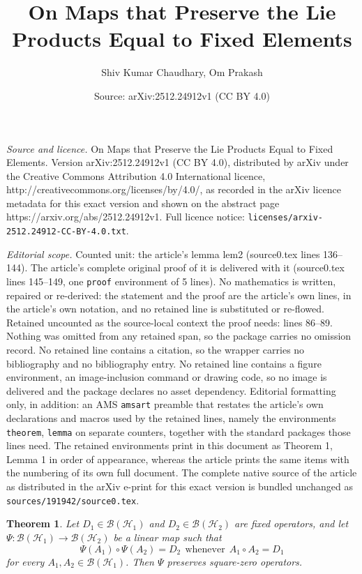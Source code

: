 \documentclass[10pt,a4paper]{amsart}
\title{On Maps that Preserve the Lie Products Equal to Fixed Elements}
\author{Shiv Kumar Chaudhary, Om Prakash}
\date{Source: arXiv:2512.24912v1 (CC BY 4.0)}
\newtheorem{theorem}{Theorem}
\begin{document}
\maketitle

\noindent\emph{Source and licence.} On Maps that Preserve the Lie Products Equal to Fixed Elements. Version arXiv:2512.24912v1 (CC BY 4.0), distributed by arXiv under the Creative Commons Attribution 4.0 International licence, http://creativecommons.org/licenses/by/4.0/, as recorded in the arXiv licence metadata for this exact version and shown on the abstract page https://arxiv.org/abs/2512.24912v1. Full licence notice: \texttt{licenses/arxiv-2512.24912-CC-BY-4.0.txt}.\par\smallskip

\noindent\textit{Editorial scope.} Counted unit: the article's lemma lem2 (source0.tex lines 136--144). The article's complete original proof of it is delivered with it (source0.tex lines 145--149, one \texttt{proof} environment of 5 lines). No mathematics is written, repaired or re-derived: the statement and the proof are the article's own lines, in the article's own notation, and no retained line is substituted or re-flowed.  Retained uncounted as the source-local context the proof needs: lines 86--89.  Nothing was omitted from any retained span, so the package carries no omission record.  No retained line contains a citation, so the wrapper carries no bibliography and no bibliography entry.  No retained line contains a figure environment, an image-inclusion command or drawing code, so no image is delivered and the package declares no asset dependency.  Editorial formatting only, in addition: an AMS \texttt{amsart} preamble that restates the article's own declarations and macros used by the retained lines, namely the environments \texttt{theorem}, \texttt{lemma} on separate counters, together with the standard packages those lines need.  The retained environments print in this document as Theorem 1, Lemma 1 in order of appearance, whereas the article prints the same items with the numbering of its own full document.  The complete native source of the article as distributed in the arXiv e-print for this exact version is bundled unchanged as \texttt{sources/191942/source0.tex}.
\begin{theorem}
    \label{th3}
	Let $D_1 \in \mathscr{B}(\mathscr{H}_1)$ and $D_2 \in \mathscr{B}(\mathscr{H}_2)$ are fixed operators, and let $\Psi : \mathscr{B}(\mathscr{H}_1) \to \mathscr{B}(\mathscr{H}_2)$ be a linear map such that $$\Psi(A_1) \circ \Psi(A_2)=D_2 ~~\text{whenever}~~ A_1 \circ A_2=D_1$$ for every $A_1,A_2 \in \mathscr{B}(\mathscr{H}_1)$. Then $\Psi$ preserves square-zero operators.
\end{theorem}
\end{document}
